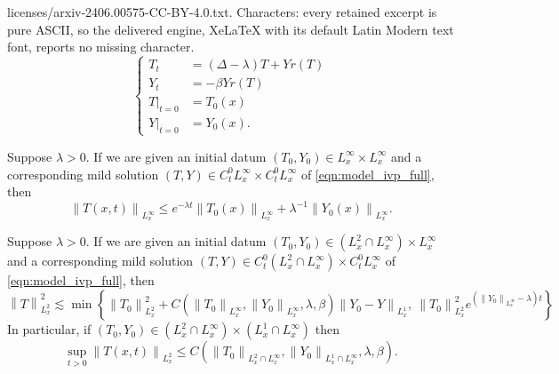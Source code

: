 \documentclass[10pt,a4paper]{amsart}
\begin{document}
licenses/arxiv-2406.00575-CC-BY-4.0.txt. Characters: every retained excerpt is pure ASCII, so the delivered engine, XeLaTeX with its default Latin Modern text font, reports no missing character.
\begin{equation}\label{eqn:model_ivp_full}
\left\{
\begin{aligned}
    T_{t} &=  \left(\Delta - \lambda\right) T + Y r\left(T\right)
    \\
    Y_{t} &= -\beta Y r\left(T\right)
    \\
    T|_{t=0} &= T_0(x)
    \\
    Y|_{t=0} &= Y_0(x). 
\end{aligned}
\right.
\end{equation}

\begin{prop}\label{prop:linfty_est}
Suppose $\lambda>0$. If we are given an initial datum $(T_0, Y_0)\in L^{\infty}_{x}\times L^{\infty}_{x}$ and a corresponding mild solution $(T,Y)\in C^{0}_{t}L^{\infty}_{x}\times C^{0}_{t}L^{\infty}_{x}$ of \eqref{eqn:model_ivp_full}, then 
\begin{equation}
 \left\|T(x,t)\right\|_{L^{\infty}_{x}} \leq e^{-\lambda t}\left\|T_0(x)\right\|_{L^{\infty}_{x}} + \lambda^{-1}\left\|Y_0(x)\right\|_{L^{\infty}_{x}}. 
\end{equation}
\end{prop}

\begin{prop} \label{prop:l2_est} 
    Suppose $\lambda >0$. If we are given an initial datum $(T_0, Y_0)\in \left(L^{2}_{x}\cap L^{\infty}_{x}\right)\times L^{\infty}_{x}$ and a corresponding mild solution $(T,Y)\in C^{0}_{t}\left(L^{2}_{x}\cap L^{\infty}_{x}\right)\times C^{0}_{t}L^{\infty}_{x}$ of \eqref{eqn:model_ivp_full}, then
    \begin{equation}\label{eqn:general_L2_estimate}
        \left\|T\right\|_{L^2_{x}}^2 \lesssim \min\left\{\left\|T_0\right\|_{L^2_{x}}^2 + C\left(\left\|T_0\right\|_{L^{\infty}_{x}}, \left\|Y_0\right\|_{ L^{\infty}_{x}}, \lambda, \beta\right)\left\|Y_0- Y\right\|_{L^1_{x}}, \ \left\|T_0\right\|_{L^2_{x}}^2 e^{\left(\left\|Y_0\right\|_{L^{\infty}_{x}}-\lambda\right)t}\right\}
    \end{equation}
    In particular, if $(T_0, Y_0)\in \left(L^{2}_{x}\cap L^{\infty}_{x}\right)\times \left(L^{1}_{x}\cap L^{\infty}_{x}\right)$ then
    \begin{equation}\label{eqn:special_L2_estimate}
        \sup_{t>0}\left\|T(x,t)\right\|_{L^2_{x}} \leq C\left(\left\|T_0\right\|_{L^2_{x}\cap L^{\infty}_{x}}, \left\|Y_0\right\|_{L^1_{x}\cap L^{\infty}_{x}}, \lambda, \beta\right). 
    \end{equation}
\end{prop}
\end{document}
